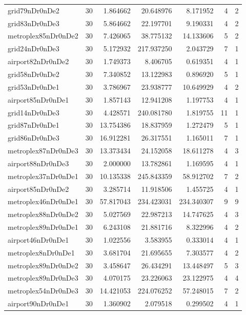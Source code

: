 \documentclass[../../../thesis.tex]{subfiles}
\begin{document}
\begin{longtable}{|l|r|r|r|r|r|r|}
grid79nDr0nDe2 & 30 & 1.864662 & 20.648976 & 8.171952 & 4 & 2 \\
grid83nDr0nDe3 & 30 & 5.864662 & 22.197701 & 9.190331 & 4 & 2 \\
metroplex85nDr0nDe2 & 30 & 7.426065 & 38.775132 & 14.133606 & 5 & 2 \\
grid24nDr0nDe3 & 30 & 5.172932 & 217.937250 & 2.043729 & 7 & 1 \\
airport82nDr0nDe2 & 30 & 1.749373 & 8.406705 & 0.619351 & 4 & 1 \\
grid58nDr0nDe2 & 30 & 7.340852 & 13.122983 & 0.896920 & 5 & 1 \\
grid53nDr0nDe1 & 30 & 3.786967 & 23.938777 & 10.649929 & 4 & 2 \\
airport85nDr0nDe1 & 30 & 1.857143 & 12.941208 & 1.197753 & 4 & 1 \\
grid14nDr0nDe3 & 30 & 4.428571 & 240.081780 & 1.819755 & 11 & 1 \\
grid87nDr0nDe1 & 30 & 13.754386 & 18.837959 & 1.272479 & 5 & 1 \\
grid86nDr0nDe3 & 30 & 16.912281 & 26.317551 & 1.165011 & 7 & 1 \\
metroplex87nDr0nDe3 & 30 & 13.373434 & 24.152058 & 18.611278 & 4 & 3 \\
airport88nDr0nDe3 & 30 & 2.000000 & 13.782861 & 1.169595 & 4 & 1 \\
metroplex37nDr0nDe1 & 30 & 10.135338 & 245.843359 & 58.912702 & 7 & 2 \\
airport85nDr0nDe2 & 30 & 3.285714 & 11.918506 & 1.455725 & 4 & 1 \\
metroplex46nDr0nDe1 & 30 & 57.817043 & 234.423031 & 234.340307 & 9 & 9 \\
metroplex88nDr0nDe2 & 30 & 5.027569 & 22.987213 & 14.747625 & 4 & 3 \\
metroplex89nDr0nDe1 & 30 & 6.243108 & 21.881716 & 8.322996 & 4 & 2 \\
airport46nDr0nDe1 & 30 & 1.022556 & 3.583955 & 0.333014 & 4 & 1 \\
metroplex8nDr0nDe1 & 30 & 3.681704 & 21.695655 & 7.303577 & 4 & 2 \\
metroplex89nDr0nDe2 & 30 & 3.458647 & 26.434291 & 13.448497 & 5 & 3 \\
metroplex89nDr0nDe3 & 30 & 4.070175 & 23.226063 & 23.122975 & 4 & 4 \\
metroplex54nDr0nDe3 & 30 & 14.421053 & 224.076252 & 57.248015 & 7 & 2 \\
airport90nDr0nDe1 & 30 & 1.360902 & 2.079518 & 0.299502 & 4 & 1 \\

\end{longtable}
\end{document}
